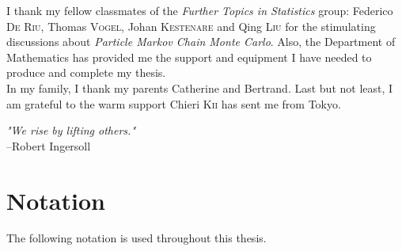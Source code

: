 \documentclass[11pt,a4,twosided,singlespacing,titlepagenumber=on]{scrreprt}
\numberwithin{equation}{chapter} %
\theoremstyle{remark}
\begin{document}
I thank my fellow classmates of the \textit{Further Topics in Statistics} group: Federico \textsc{De Riu}, Thomas \textsc{Vogel}, Johan \textsc{Kestenare} and Qing \textsc{Liu} for the stimulating discussions about \textit{Particle Markov Chain Monte Carlo}. Also, the Department of Mathematics has provided me the support and equipment I have needed to produce and complete my thesis. \\

In my family, I thank my parents Catherine and Bertrand. Last but not least, I am grateful to the warm support Chieri \textsc{Kii} has sent me from Tokyo. \\ 

\begin{flushright} \textit{"We rise by lifting others."} \\
--Robert Ingersoll \\
\end{flushright}

\renewcommand{\contentsname}{Table of Contents}
\setcounter{tocdepth}{4}
\setcounter{secnumdepth}{4}
\tableofcontents

\listoffigures
\listoftables

\chapter*{Notation}
The following notation is used throughout this thesis.
\end{document}
